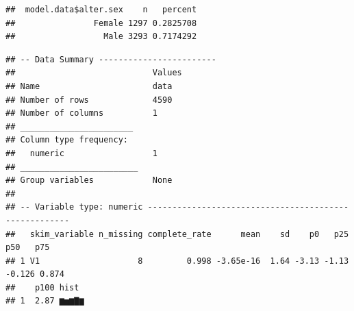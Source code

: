 \documentclass[
]{book}
\newenvironment{Shaded}{\begin{snugshade}}{\end{snugshade}}
\newcommand{\CommentTok}[1]{\textcolor[rgb]{0.56,0.35,0.01}{\textit{#1}}}
\newcommand{\DocumentationTok}[1]{\textcolor[rgb]{0.56,0.35,0.01}{\textbf{\textit{#1}}}}
\newcommand{\FunctionTok}[1]{\textcolor[rgb]{0.00,0.00,0.00}{#1}}
\newcommand{\NormalTok}[1]{#1}
\newcommand{\SpecialCharTok}[1]{\textcolor[rgb]{0.00,0.00,0.00}{#1}}
\begin{document}
\begin{Shaded}
\end{Shaded}

\begin{verbatim}
##  model.data$alter.sex    n   percent
##                Female 1297 0.2825708
##                  Male 3293 0.7174292
\end{verbatim}

\begin{Shaded}
\end{Shaded}

\begin{verbatim}
## -- Data Summary ------------------------
##                            Values
## Name                       data  
## Number of rows             4590  
## Number of columns          1     
## _______________________          
## Column type frequency:           
##   numeric                  1     
## ________________________         
## Group variables            None  
## 
## -- Variable type: numeric ------------------------------------------------------
##   skim_variable n_missing complete_rate      mean    sd    p0   p25    p50   p75
## 1 V1                    8         0.998 -3.65e-16  1.64 -3.13 -1.13 -0.126 0.874
##    p100 hist 
## 1  2.87 ▆▅▆▇▆
\end{verbatim}
\end{document}

